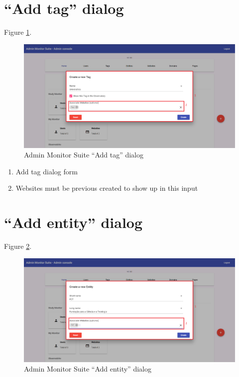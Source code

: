 \section{``Add tag'' dialog}
\label{sec:admin_add_tag_dialog}

Figure \ref{fig:admin_add_tag_dialog}.

\begin{figure}[H]
    \centering
    \includegraphics[width=\linewidth]{lib/images/admin/admin_add_tag_dialog.png}
    \caption{Admin Monitor Suite ``Add tag'' dialog}
    \label{fig:admin_add_tag_dialog}
\end{figure}

\begin{enumerate}
    \item Add tag dialog form
    \item Websites must be previous created to show up in this input
\end{enumerate}

\clearpage

\section{``Add entity'' dialog}
\label{sec:admin_add_entity_dialog}

Figure \ref{fig:admin_add_entity_dialog}.

\begin{figure}[H]
    \centering
    \includegraphics[width=\linewidth]{lib/images/admin/admin_add_entity_dialog.png}
    \caption{Admin Monitor Suite ``Add entity'' dialog}
    \label{fig:admin_add_entity_dialog}
\end{figure}

